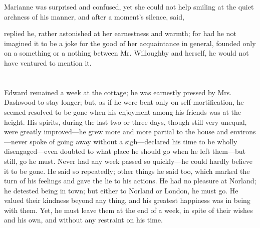 



Marianne was surprised and confused, yet she could not help smiling at the quiet archness of his manner, and after a moment's silence, said,


 replied he, rather astonished at her earnestness and warmth; for had he not imagined it to be a joke for the good of her acquaintance in general, founded only on a something or a nothing between Mr. Willoughby and herself, he would not have ventured to mention it.

\chapter{} %

Edward remained a week at the cottage; he was earnestly pressed by Mrs. Dashwood to stay longer; but, as if he were bent only on self-mortification, he seemed resolved to be gone when his enjoyment among his friends was at the height. His spirits, during the last two or three days, though still very unequal, were greatly improved---he grew more and more partial to the house and environs---never spoke of going away without a sigh---declared his time to be wholly disengaged---even doubted to what place he should go when he left them---but still, go he must. Never had any week passed so quickly---he could hardly believe it to be gone. He said so repeatedly; other things he said too, which marked the turn of his feelings and gave the lie to his actions. He had no pleasure at Norland; he detested being in town; but either to Norland or London, he must go. He valued their kindness beyond any thing, and his greatest happiness was in being with them. Yet, he must leave them at the end of a week, in spite of their wishes and his own, and without any restraint on his time.


